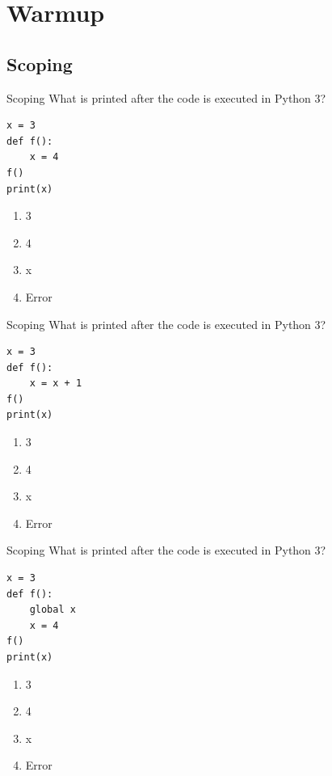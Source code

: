 \documentclass[9pt]{beamer}
\title{\themidterm}
\author{\theauthors}
\institute{\theorganization}
\date{\thedate}
\begin{document}

\begin{frame}
  \titlepage
\end{frame}

\section{Warmup}
\subsection{Scoping}
\begin{frame}[fragile]{Scoping}
  What is printed after the code is executed in Python 3?

  \begin{lstlisting}
x = 3
def f():
    x = 4
f()
print(x)
  \end{lstlisting}

  \begin{enumerate}
    \item
      \alert<2>{3}
    \item
      4
    \item
      x
    \item
      Error
  \end{enumerate}
\end{frame}

\begin{frame}[fragile]{Scoping}
  What is printed after the code is executed in Python 3?

  \begin{lstlisting}
x = 3
def f():
    x = x + 1
f()
print(x)
  \end{lstlisting}

  \begin{enumerate}
    \item
      3
    \item
      4
    \item
      x
    \item
      \alert<2>{Error}
  \end{enumerate}
\end{frame}

\begin{frame}[fragile]{Scoping}
  What is printed after the code is executed in Python 3?

  \begin{lstlisting}
x = 3
def f():
    global x
    x = 4
f()
print(x)
  \end{lstlisting}

  \begin{enumerate}
    \item
      3
    \item
      \alert<2>{4}
    \item
      x
    \item
      Error
  \end{enumerate}
\end{frame}
\end{document}
